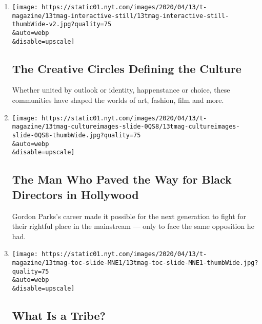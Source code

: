 \begin{enumerate}
\def\labelenumi{\arabic{enumi}.}
\item
  \href{/interactive/2020/04/13/t-magazine/culture-issue-2020.html}{}

  \texttt{[image: https://static01.nyt.com/images/2020/04/13/t-magazine/13tmag-interactive-still/13tmag-interactive-still-thumbWide-v2.jpg?quality=75\\\&auto=webp\\\&disable=upscale]}

  \hypertarget{the-creative-circles-defining-the-culture}{%
  \subsection{The Creative Circles Defining the
  Culture}\label{the-creative-circles-defining-the-culture}}

  Whether united by outlook or identity, happenstance or choice, these
  communities have shaped the worlds of art, fashion, film and more.
\item
  \href{/interactive/2020/04/13/t-magazine/gordon-parks.html}{}

  \texttt{[image: https://static01.nyt.com/images/2020/04/13/t-magazine/13tmag-cultureimages-slide-0QS8/13tmag-cultureimages-slide-0QS8-thumbWide.jpg?quality=75\\\&auto=webp\\\&disable=upscale]}

  \hypertarget{the-man-who-paved-the-way-for-black-directors-in-hollywood}{%
  \subsection{The Man Who Paved the Way for Black Directors in
  Hollywood}\label{the-man-who-paved-the-way-for-black-directors-in-hollywood}}

  Gordon Parks's career made it possible for the next generation to
  fight for their rightful place in the mainstream --- only to face the
  same opposition he had.
\item
  \href{/interactive/2020/04/13/t-magazine/tribe-meaning.html}{}

  \texttt{[image: https://static01.nyt.com/images/2020/04/13/t-magazine/13tmag-toc-slide-MNE1/13tmag-toc-slide-MNE1-thumbWide.jpg?quality=75\\\&auto=webp\\\&disable=upscale]}

  \hypertarget{what-is-a-tribe}{%
  \subsection{What Is a Tribe?}\label{what-is-a-tribe}}


\end{enumerate}
